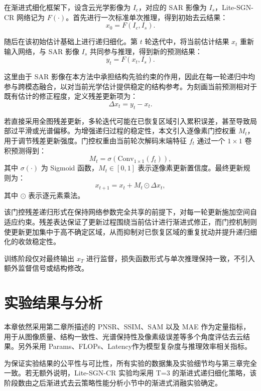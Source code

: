 在渐进式细化框架下，设含云光学影像为 $I_c$，对应的 SAR 影像为 $I_s$，Lite-SGN-CR 网络记为 $F(\cdot)$。首先进行一次标准单次推理，得到初始去云结果：
\begin{equation}
x_0 = F(I_c, I_s).
\end{equation}

随后在该初始估计基础上进行递归细化。第 $t$ 轮迭代中，将当前估计结果 $x_t$ 重新输入网络，与 SAR 影像 $I_s$ 共同参与推理，得到新的预测结果：
\begin{equation}
y_t = F(x_t, I_s).
\end{equation}

这里由于 SAR 影像在本方法中承担结构先验约束的作用，因此在每一轮递归中均参与跨模态融合，以对当前光学估计提供稳定的结构参考。为刻画当前预测相对于既有估计的修正程度，定义残差更新项为：
\begin{equation}
\Delta x_t = y_t - x_t.
\end{equation}

若直接采用全图残差更新，多轮迭代可能在已恢复区域引入累积误差，甚至导致局部过平滑或光谱偏移。为增强递归过程的稳定性，本文引入逐像素门控权重 $M_t$，用于调节残差更新强度。门控权重由当前轮次解码末端特征 $f_t$ 通过一个 $1\times1$ 卷积预测得到：
\begin{equation}
M_t = \sigma\left(\mathrm{Conv}_{1\times1}(f_t)\right),
\end{equation}
其中 $\sigma(\cdot)$ 为 Sigmoid 函数，$M_t \in [0,1]$ 表示逐像素更新置信度。最终更新规则为：
\begin{equation}
x_{t+1} = x_t + M_t \odot \Delta x_t,
\end{equation}
其中 $\odot$ 表示逐元素乘法。

该门控残差递归形式在保持网络参数完全共享的前提下，对每一轮更新施加空间自适应约束。残差表达保证了更新过程围绕当前估计进行渐进式修正，而门控机制则使更新更加集中于高不确定区域，从而抑制对已恢复区域的重复扰动并提升递归细化的收敛稳定性。

训练阶段仅对最终输出 $x_T$ 进行监督，损失函数形式与单次推理保持一致，不引入额外监督信号或结构修改。

\section{实验结果与分析}

本章依然采用第二章所描述的 PNSR、SSIM、SAM 以及 MAE 作为定量指标，用于从图像质量、结构一致性、光谱保持性及像素级误差等多个角度评估去云结果。另外采用 Params、FLOPs、Latency作为模型复杂度与推理效率相关指标。

为保证实验结果的公平性与可比性，所有实验的数据集及实验细节均与第三章完全一致。若无额外说明，Lite-SGN-CR 实验均采用 T=3 的渐进式递归细化策略，该阶段数由之后渐进式去云策略性能分析小节中的渐进式消融实验确定。

